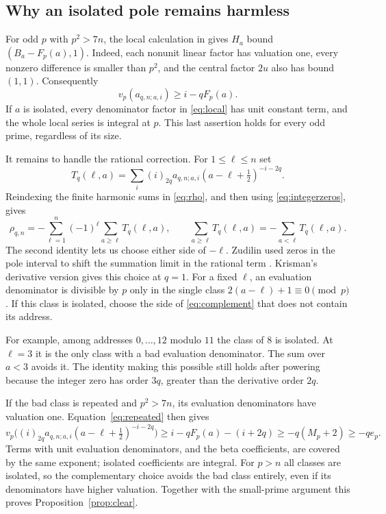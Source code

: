\documentclass[11pt]{article}
\theoremstyle{remark}
\numberwithin{equation}{section}
\begin{document}
\subsection{Why an isolated pole remains harmless}

For odd $p$ with $p^2>7n$, the local calculation in
\cite[Section~3, local-coefficient lemma]{fifteen} gives $H_a$
bound $(B_a-F_p(a),1)$. Indeed, each nonunit linear factor has
valuation one, every nonzero difference is smaller than $p^2$,
and the central factor $2u$ also has bound $(1,1)$.
Consequently
\begin{equation}\label{eq:repeated}
 v_p(a_{q,n;a,i})\ge i-qF_p(a).
\end{equation}
If $a$ is isolated, every denominator factor in \eqref{eq:local}
has unit constant term, and the whole local series is integral at
$p$. This last assertion holds for every odd prime, regardless
of its size.

It remains to handle the rational correction. For $1\le\ell\le n$ set
\[
 T_q(\ell,a)=\sum_i(i)_{2q}a_{q,n;a,i}
                       (a-\ell+\tfrac12)^{-i-2q}.
\]
Reindexing the finite harmonic sums in \eqref{eq:rho}, and then
using \eqref{eq:integerzeros}, gives
\begin{equation}\label{eq:complement}
 \rho_{q,n}=-\sum_{\ell=1}^n(-1)^\ell
                      \sum_{a\ge\ell}T_q(\ell,a),
 \qquad
 \sum_{a\ge\ell}T_q(\ell,a)
             =-\sum_{a<\ell}T_q(\ell,a).
\end{equation}
The second identity lets us choose either side of $-\ell$.
Zudilin used zeros in the pole interval to shift the summation limit
in the rational term \cite[proof of Lemma~1]{zudbeta}. Krisman's
derivative version \cite[Lemma~4.6]{krisman} gives this choice at $q=1$.
For a fixed $\ell$, an evaluation denominator is divisible by
$p$ only in the single class $2(a-\ell)+1\equiv0\pmod p$.
If this class is isolated, choose the side of
\eqref{eq:complement} that does not contain its address.

For example, among addresses $0,\ldots,12$ modulo $11$ the class
of $8$ is isolated. At $\ell=3$ it is the only class with a bad
evaluation denominator. The sum over $a<3$ avoids it. The identity
making this possible still holds after powering because the
integer zero has order $3q$, greater than the derivative order $2q$.

If the bad class is repeated and $p^2>7n$, its evaluation
denominators have valuation one. Equation~\eqref{eq:repeated}
then gives
\[
 v_p\bigl((i)_{2q}a_{q,n;a,i}
                    (a-\ell+\tfrac12)^{-i-2q}\bigr)
 \ge i-qF_p(a)-(i+2q)
 \ge-q(M_p+2)\ge-qe_p.
\]
Terms with unit evaluation denominators, and the beta coefficients,
are covered by the same exponent; isolated coefficients are integral.
For $p>n$ all classes are isolated, so the complementary choice avoids
the bad class entirely, even if its denominators have higher
valuation. Together with the small-prime argument this proves
Proposition~\ref{prop:clear}.
\end{document}

